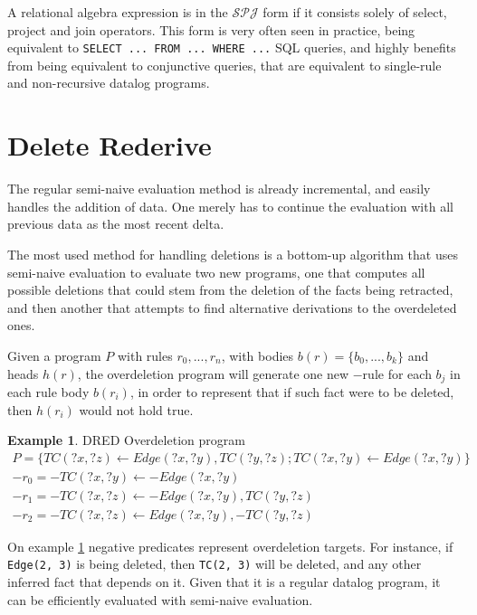 \documentclass[sigconf,screen,review,natbib]{acmart}
\theoremstyle{definition}
\newtheorem{exmp}{Example}[section]
\begin{document}
A relational algebra expression is in the $\mathcal{SPJ}$ form if it consists solely of select, project and join operators. This form
is very often seen in practice, being equivalent to \verb|SELECT ... FROM ... WHERE ...| SQL queries, and highly benefits from being
equivalent to conjunctive queries, that are equivalent to single-rule and non-recursive datalog programs.

\section{Delete Rederive}

The regular semi-naive evaluation method is already incremental, and easily handles the addition of data. One merely has to continue the evaluation with all previous data as the most recent delta.

The most used method for handling deletions is a bottom-up algorithm\cite{dred} that uses semi-naive evaluation to evaluate two new programs, one that computes all possible deletions that could stem from the deletion of the facts being retracted, and then another that attempts to find alternative derivations to the overdeleted ones.

Given a program $P$ with rules $r_0, ..., r_n$, with bodies $b(r) = \{b_0, ..., b_k\}$ and heads $h(r)$, the overdeletion program will generate one new $-$rule for each $b_j$ in each rule body $b(r_i)$, in order to represent that if such fact were to be deleted, then $h(r_i)$ would not hold true.

\begin{exmp}{DRED Overdeletion program}
	\tiny
	\begin{align}
		P = \{ TC(?x, ?z) \leftarrow Edge(?x, ?y), TC(?y, ?z); TC(?x, ?y) \leftarrow Edge(?x, ?y) \} \nonumber                                                \\
		-r_0 = -TC(?x, ?y) \leftarrow -Edge(?x, ?y)                                                                                                           \\
		-r_1 = -TC(?x, ?z) \leftarrow -Edge(?x, ?y), TC(?y, ?z)                                                                                     \nonumber \\
		-r_2 = -TC(?x, ?z) \leftarrow Edge(?x, ?y), -TC(?y, ?z)
	\end{align}
	\label{ex6}
\end{exmp}

On example \ref{ex6} negative predicates represent overdeletion targets. For instance, if \verb|Edge(2, 3)| is being deleted, then \verb|TC(2, 3)| will be deleted, and any other inferred fact that depends on it. Given that it is a regular datalog program, it can be efficiently evaluated with semi-naive evaluation.
\end{document}

